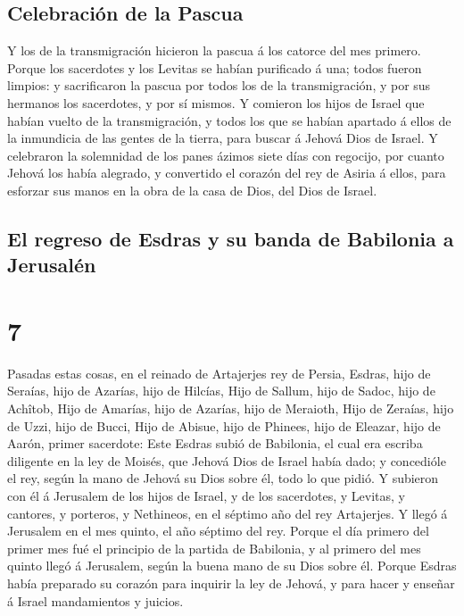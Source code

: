 \hypertarget{celebraciuxf3n-de-la-pascua}{%
\subsection{Celebración de la
Pascua}\label{celebraciuxf3n-de-la-pascua}}

 Y los de la transmigración hicieron la pascua á los
catorce del mes primero.  Porque los sacerdotes y los
Levitas se habían purificado á una; todos fueron limpios: y sacrificaron
la pascua por todos los de la transmigración, y por sus hermanos los
sacerdotes, y por sí mismos.  Y comieron los hijos de
Israel que habían vuelto de la transmigración, y todos los que se habían
apartado á ellos de la inmundicia de las gentes de la tierra, para
buscar á Jehová Dios de Israel.  Y celebraron la
solemnidad de los panes ázimos siete días con regocijo, por cuanto
Jehová los había alegrado, y convertido el corazón del rey de Asiria á
ellos, para esforzar sus manos en la obra de la casa de Dios, del Dios
de Israel.

\hypertarget{el-regreso-de-esdras-y-su-banda-de-babilonia-a-jerusaluxe9n}{%
\subsection{El regreso de Esdras y su banda de Babilonia a
Jerusalén}\label{el-regreso-de-esdras-y-su-banda-de-babilonia-a-jerusaluxe9n}}

\hypertarget{section-15-7}{%
\section{7}\label{section-15-7}}

 Pasadas estas cosas, en el reinado de Artajerjes rey de
Persia, Esdras, hijo de Seraías, hijo de Azarías, hijo de Hilcías,
 Hijo de Sallum, hijo de Sadoc, hijo de Achîtob,
 Hijo de Amarías, hijo de Azarías, hijo de Meraioth,
 Hijo de Zeraías, hijo de Uzzi, hijo de Bucci,
 Hijo de Abisue, hijo de Phinees, hijo de Eleazar, hijo de
Aarón, primer sacerdote:  Este Esdras subió de Babilonia,
el cual era escriba diligente en la ley de Moisés, que Jehová Dios de
Israel había dado; y concedióle el rey, según la mano de Jehová su Dios
sobre él, todo lo que pidió.  Y subieron con él á
Jerusalem de los hijos de Israel, y de los sacerdotes, y Levitas, y
cantores, y porteros, y Nethineos, en el séptimo año del rey Artajerjes.
 Y llegó á Jerusalem en el mes quinto, el año séptimo del
rey.  Porque el día primero del primer mes fué el
principio de la partida de Babilonia, y al primero del mes quinto llegó
á Jerusalem, según la buena mano de su Dios sobre él. 
Porque Esdras había preparado su corazón para inquirir la ley de Jehová,
y para hacer y enseñar á Israel mandamientos y juicios.

